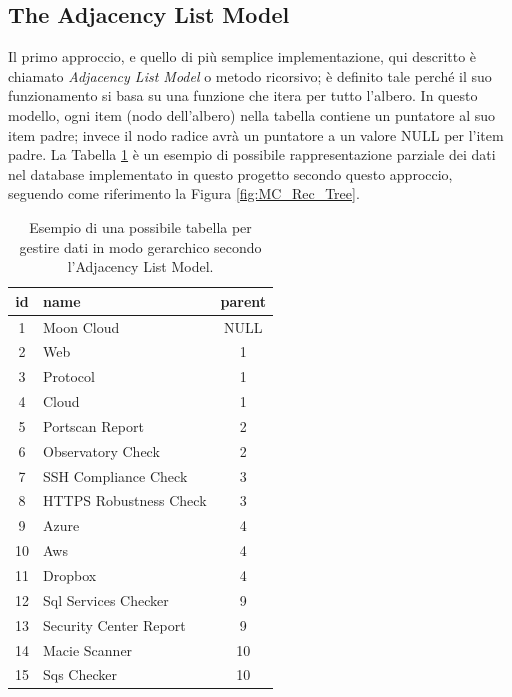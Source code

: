 \subsection{The Adjacency List Model}
Il primo approccio, e quello di più semplice implementazione, qui descritto è chiamato \textit{Adjacency List Model} o metodo ricorsivo; 
è definito tale perché il suo funzionamento si basa su una funzione che itera per tutto l'albero.\hfill\break
In questo modello, ogni item (nodo dell'albero) nella tabella contiene un puntatore al suo item padre; invece il nodo radice avrà un 
puntatore a un valore NULL per l'item padre.\hfill\break
La Tabella \ref{table:adjacency_list_model_table} è un esempio di possibile rappresentazione parziale dei dati nel database implementato 
in questo progetto secondo questo approccio, seguendo come riferimento la Figura \ref{fig:MC_Rec_Tree}.
%
\begin{table}[ht!]
\centering
\begin{tabular}[c]{| c | l | c |} 
    \hline
    id & name & parent \\ [0.5ex] 
    \hline
    \rowcolor{rootnodecell} 1 & Moon Cloud & NULL \\ [0.5ex] 
    \rowcolor{categorycell} 2 & Web & 1 \\ [0.5ex] 
    \rowcolor{categorycell} 3 & Protocol & 1 \\ [0.5ex] 
    \rowcolor{categorycell} 4 & Cloud & 1 \\ [0.5ex] 
    \rowcolor{evaluationcell} 5 & Portscan Report & 2 \\ [0.5ex] 
    \rowcolor{evaluationcell} 6 & Observatory Check & 2 \\ [0.5ex] 
    \rowcolor{evaluationcell} 7 & SSH Compliance Check & 3 \\ [0.5ex] 
    \rowcolor{evaluationcell} 8 & HTTPS Robustness Check & 3 \\ [0.5ex] 
    \rowcolor{categorycell} 9 & Azure & 4 \\ [0.5ex] 
    \rowcolor{categorycell} 10 & Aws & 4 \\ [0.5ex] 
    \rowcolor{categorycell} 11 & Dropbox & 4 \\ [0.5ex] 
    \rowcolor{evaluationcell} 12 & Sql Services Checker & 9 \\ [0.5ex] 
    \rowcolor{evaluationcell} 13 & Security Center Report & 9 \\ [0.5ex] 
    \rowcolor{evaluationcell} 14 & Macie Scanner & 10 \\ [0.5ex] 
    \rowcolor{evaluationcell} 15 & Sqs Checker & 10 \\ [0.5ex]
    \hline
\end{tabular}
\caption{Esempio di una possibile tabella per gestire dati in modo gerarchico secondo l'Adjacency List Model.}
\label{table:adjacency_list_model_table}
\end{table}

